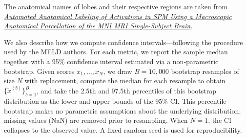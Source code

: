 \documentclass[a4paper,12pt]{article}
\begin{document}
The anatomical names of lobes and their respective regions are taken from
\href{https://www.sciencedirect.com/science/article/pii/S1053811901909784}{\textit{Automated Anatomical Labeling of Activations in SPM Using a Macroscopic Anatomical Parcellation of the MNI MRI Single-Subject Brain}}.

\begin{tcolorbox}[myhighlight]
We also describe how we compute confidence intervals—following the procedure used by the MELD authors. For each metric, we report the sample median together with a 95\% confidence interval estimated via a non-parametric bootstrap. Given scores $x_1,\dots,x_N$, we draw $B=10{,}000$ bootstrap resamples of size $N$ with replacement, compute the median for each resample to obtain $\{\tilde{x}^{(b)}\}_{b=1}^{B}$, and take the 2.5th and 97.5th percentiles of this bootstrap distribution as the lower and upper bounds of the 95\% CI. This percentile bootstrap makes no parametric assumptions about the underlying distribution; missing values (NaN) are removed prior to resampling. When $N=1$, the CI collapses to the observed value. A fixed random seed is used for reproducibility.
\end{tcolorbox}
\end{document}
